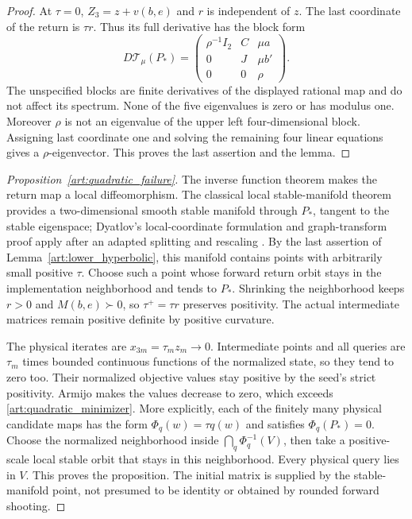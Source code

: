 \begin{proof}
At $\tau=0$, $Z_3=z+v(b,e)$ and $r$ is independent of $z$.
The last coordinate of the return is $\tau r$. Thus its full derivative
has the block form
\[
 D\mathcal T_\mu(P_*)=
 \begin{pmatrix}
 \rho^{-1}I_2&C&\mu a\\0&J&\mu b'\\0&0&\rho
 \end{pmatrix}.
\]
The unspecified blocks are finite derivatives of the displayed rational
map and do not affect its spectrum. None of the five eigenvalues is zero
or has modulus one. Moreover $\rho$ is not an eigenvalue of the upper
left four-dimensional block. Assigning last coordinate one and solving
the remaining four linear equations gives a $\rho$-eigenvector. This
proves the last assertion and the lemma.
\end{proof}

\begin{proof}[Proposition~\ref{art:quadratic_failure}]
The inverse function theorem makes the return map a local diffeomorphism.
The classical local stable-manifold theorem provides a two-dimensional
smooth stable manifold through $P_*$, tangent to the stable eigenspace;
Dyatlov's local-coordinate formulation and graph-transform proof apply
after an adapted splitting and rescaling
.
By the last assertion of
Lemma~\ref{art:lower_hyperbolic}, this manifold contains points with
arbitrarily small positive $\tau$.
Choose such a point whose forward return orbit stays in the implementation
neighborhood and tends to $P_*$. Shrinking the neighborhood keeps $r>0$
and $M(b,e)\succ0$, so $\tau^+=\tau r$ preserves positivity. The actual
intermediate matrices remain positive definite by positive curvature.

The physical iterates are $x_{3m}=\tau_mz_m\to0$. Intermediate points
and all queries are $\tau_m$ times bounded continuous functions of the
normalized state, so they tend to zero too. Their normalized objective
values stay positive by the seed's strict positivity. Armijo makes the
values decrease to zero, which exceeds \eqref{art:quadratic_minimizer}.
More explicitly, each of the finitely many physical candidate maps has
the form $\Phi_q(w)=\tau q(w)$ and satisfies $\Phi_q(P_*)=0$.
Choose the normalized neighborhood inside
$\bigcap_q\Phi_q^{-1}(V)$, then take a positive-scale local stable orbit
that stays in this neighborhood. Every physical query lies in $V$.
This proves the proposition. The initial
matrix is supplied by the stable-manifold point, not presumed to be
identity or obtained by rounded forward shooting.
\end{proof}

